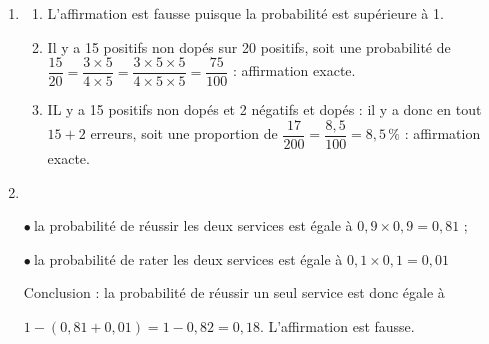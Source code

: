 \medskip

\begin{enumerate}
\item
	\begin{enumerate}
		\item L'affirmation est fausse puisque la probabilité est supérieure à 1.
		\item Il y a 15 positifs non dopés sur 20 positifs, soit une probabilité de $\dfrac{15}{20} = \dfrac{3 \times 5}{4 \times 5} = \dfrac{3 \times 5\times 5}{4 \times 5\times 5} = \dfrac{75}{100}$ : affirmation exacte.
		\item IL y a 15 positifs non dopés et 2 négatifs et dopés : il y a donc en tout $15 + 2$ erreurs, soit une proportion de $\dfrac{17}{200} = \dfrac{8,5}{100} = 8,5\,\%$ : affirmation exacte.
	\end{enumerate}
\item~

$\bullet~$la probabilité de réussir les deux services est égale à $0,9 \times 0,9 = 0,81$ ;

$\bullet~$la probabilité de rater les deux services est égale à $0,1 \times 0,1 = 0,01$

Conclusion : la probabilité de réussir un seul service est donc égale à 

$1 - (0,81 + 0,01) = 1 - 0,82 = 0,18$. L'affirmation est fausse.
\end{enumerate}
